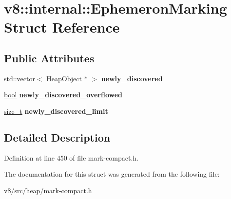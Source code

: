 \hypertarget{structv8_1_1internal_1_1EphemeronMarking}{}\section{v8\+:\+:internal\+:\+:Ephemeron\+Marking Struct Reference}
\label{structv8_1_1internal_1_1EphemeronMarking}
\subsection*{Public Attributes}
\begin{DoxyCompactItemize}
\item 
\mbox{\label{structv8_1_1internal_1_1EphemeronMarking_abe18e1031e1d4b0d3ddb58d35574c925}} 
std\+::vector$<$ \mbox{\hyperlink{classv8_1_1internal_1_1HeapObject}{Heap\+Object}} $\ast$ $>$ {\bfseries newly\+\_\+discovered}
\item 
\mbox{\label{structv8_1_1internal_1_1EphemeronMarking_a880dff524fb7e7d3b0df5781d3d1077d}} 
\mbox{\hyperlink{classbool}{bool}} {\bfseries newly\+\_\+discovered\+\_\+overflowed}
\item 
\mbox{\label{structv8_1_1internal_1_1EphemeronMarking_a32d2dab1c9fc92fc74c2ad3e576012dc}} 
\mbox{\hyperlink{classsize__t}{size\+\_\+t}} {\bfseries newly\+\_\+discovered\+\_\+limit}
\end{DoxyCompactItemize}


\subsection{Detailed Description}


Definition at line 450 of file mark-\/compact.\+h.



The documentation for this struct was generated from the following file\+:\begin{DoxyCompactItemize}
\item 
v8/src/heap/mark-\/compact.\+h\end{DoxyCompactItemize}
